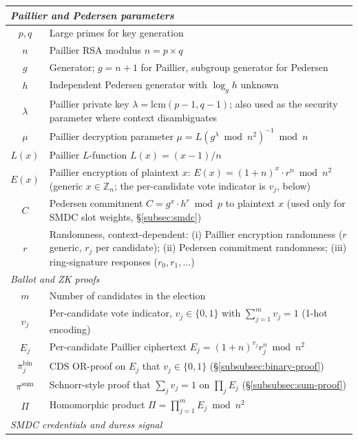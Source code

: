 {\begin{longtable}{|c|p{10cm}|}
\multicolumn{2}{|l|}{\textit{Paillier and Pedersen parameters}} \\
\hline
$p, q$ & Large primes for key generation \\
\hline
$n$ & Paillier RSA modulus $n = p \times q$ \\
\hline
$g$ & Generator; $g = n + 1$ for Paillier, subgroup generator for Pedersen \\
\hline
$h$ & Independent Pedersen generator with $\log_g h$ unknown \\
\hline
$\lambda$ & Paillier private key $\lambda = \text{lcm}(p-1, q-1)$; also used as the security parameter where context disambiguates \\
\hline
$\mu$ & Paillier decryption parameter $\mu = L(g^\lambda \bmod n^2)^{-1} \bmod n$ \\
\hline
$L(x)$ & Paillier $L$-function $L(x) = (x-1)/n$ \\
\hline
$E(x)$ & Paillier encryption of plaintext $x$: $E(x) = (1+n)^{x} \cdot r^{n} \bmod n^2$ (generic $x \in \mathbb{Z}_n$; the per-candidate vote indicator is $v_j$, below) \\
\hline
$C$ & Pedersen commitment $C = g^{x} \cdot h^{r} \bmod p$ to plaintext $x$ (used only for SMDC slot weights, \S\ref{subsec:smdc}) \\
\hline
$r$ & Randomness, context-dependent: (i) Paillier encryption randomness ($r$ generic, $r_j$ per candidate); (ii) Pedersen commitment randomness; (iii) ring-signature responses ($r_0, r_1, \ldots$) \\
\hline
\multicolumn{2}{|l|}{\textit{Ballot and ZK proofs}} \\
\hline
$m$ & Number of candidates in the election \\
\hline
$v_j$ & Per-candidate vote indicator, $v_j \in \{0,1\}$ with $\sum_{j=1}^{m} v_j = 1$ (1-hot encoding) \\
\hline
$E_j$ & Per-candidate Paillier ciphertext $E_j = (1+n)^{v_j} r_j^{n} \bmod n^2$ \\
\hline
$\pi_j^{\text{bin}}$ & CDS OR-proof on $E_j$ that $v_j \in \{0,1\}$ (\S\ref{subsubsec:binary-proof}) \\
\hline
$\pi^{\text{sum}}$ & Schnorr-style proof that $\sum_j v_j = 1$ on $\prod_j E_j$ (\S\ref{subsubsec:sum-proof}) \\
\hline
$\Pi$ & Homomorphic product $\Pi = \prod_{j=1}^{m} E_j \bmod n^2$ \\
\hline
\multicolumn{2}{|l|}{\textit{SMDC credentials and duress signal}} \\

\end{longtable}}
